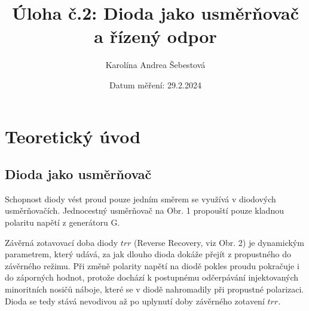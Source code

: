\documentclass[a4paper, czech]{article}
\title{Úloha č.2: Dioda jako usměrňovač a řízený odpor}
\author{Karolína Andrea Šebestová}
\date{Datum měření: 29.2.2024}
\begin{document}
\maketitle

\section{Teoretický úvod}
\subsection{Dioda jako usměrňovač}

Schopnost diody vést proud pouze jedním směrem se využívá
v diodových usměrňovačích. Jednocestný usměrňovač na Obr. 1
propouští pouze kladnou polaritu napětí z generátoru G.

Závěrná zotavovací doba diody $trr$
(Reverse Recovery, viz Obr. 2)
je dynamickým parametrem, který udává, za jak dlouho dioda dokáže přejít z
propustného do závěrného režimu. Při změně polarity napětí na diodě pokles
proudu pokračuje i do záporných hodnot, protože dochází k postupnému
odčerpávání injektovaných minoritních nosičů náboje, které se v diodě
nahromadily při propustné polarizaci. Dioda se tedy stává nevodivou až po
uplynutí doby závěrného zotavení $trr$.
\end{document}
